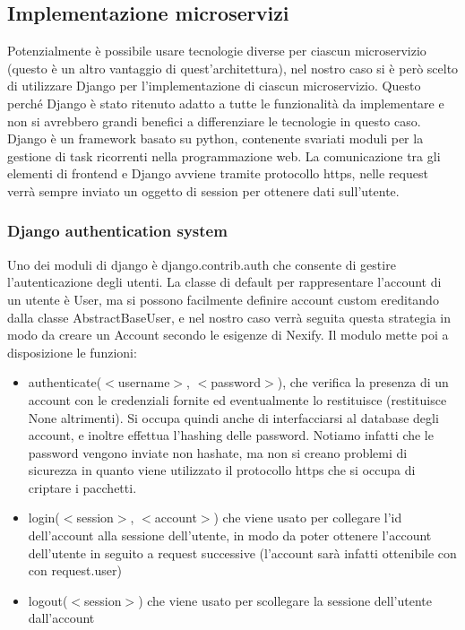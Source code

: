 \subsection{Implementazione microservizi}
Potenzialmente è possibile usare tecnologie diverse per ciascun microservizio (questo è un altro vantaggio di quest'architettura), nel nostro caso si è però scelto di utilizzare Django per l'implementazione di ciascun microservizio. Questo perché Django è stato ritenuto adatto a tutte le funzionalità da implementare e non si avrebbero grandi benefici a differenziare le tecnologie in questo caso. Django è un framework basato su python, contenente svariati moduli per la gestione di task ricorrenti nella programmazione web. La comunicazione tra gli elementi di frontend e Django avviene tramite protocollo https, nelle request verrà sempre inviato un oggetto di session per ottenere dati sull'utente.
\subsubsection{Django authentication system}
Uno dei moduli di django è django.contrib.auth che consente di gestire l'autenticazione degli utenti. La classe di default per rappresentare l'account di un utente è User, ma si possono facilmente definire account custom ereditando dalla classe AbstractBaseUser, e nel nostro caso verrà seguita questa strategia in modo da creare un Account secondo le esigenze di Nexify. Il modulo mette poi a disposizione le funzioni:
\begin{itemize}
\item authenticate($<$username$>$, $<$password$>$), che verifica la presenza di un account con le credenziali fornite ed eventualmente lo restituisce (restituisce None altrimenti). Si occupa quindi anche di interfacciarsi al database degli account, e inoltre effettua l'hashing delle password. Notiamo infatti che le password vengono inviate non hashate, ma non si creano problemi di sicurezza in quanto viene utilizzato il protocollo https che si occupa di criptare i pacchetti. 
\item login($<$session$>$, $<$account$>$) che viene usato per collegare l'id dell'account alla sessione dell'utente, in modo da poter ottenere l'account dell'utente in seguito a request successive (l'account sarà infatti ottenibile con con request.user)
\item logout($<$session$>$) che viene usato per scollegare la sessione dell'utente dall'account
\end{itemize}
